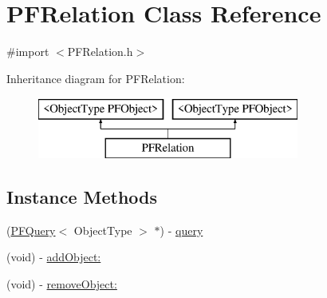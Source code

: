 \hypertarget{interface_p_f_relation}{}\section{P\+F\+Relation Class Reference}
\label{interface_p_f_relation}


{\ttfamily \#import $<$P\+F\+Relation.\+h$>$}

Inheritance diagram for P\+F\+Relation\+:\begin{figure}[H]
\begin{center}
\leavevmode
\includegraphics[height=2.000000cm]{interface_p_f_relation}
\end{center}
\end{figure}
\subsection*{Instance Methods}
\begin{DoxyCompactItemize}
\item 
(\hyperlink{class_p_f_query}{P\+F\+Query}$<$ Object\+Type $>$ $\ast$) -\/ \hyperlink{interface_p_f_relation_a9fec978a2192c1452e56ede4551a14b2}{query}
\begin{DoxyCompactList}\small\item\em 

 \end{DoxyCompactList}\item 
(void) -\/ \hyperlink{interface_p_f_relation_a28af311372ef3190483e82ca89599510}{add\+Object\+:}
\begin{DoxyCompactList}\small\item\em 

 \end{DoxyCompactList}\item 
(void) -\/ \hyperlink{interface_p_f_relation_aa7c652e7f27acf337b116278d02bbc24}{remove\+Object\+:}
\end{DoxyCompactItemize}

